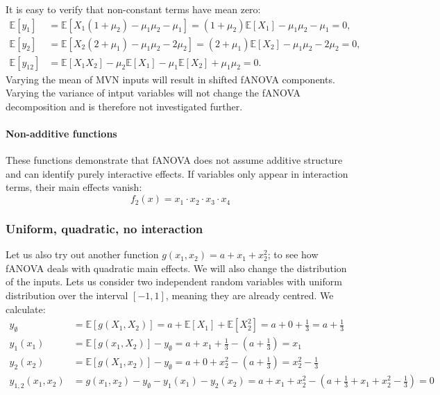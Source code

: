 It is easy to verify that non-constant terms have mean zero:
\begin{align*}
    \mathbb{E}[y_1] &= \mathbb{E}[X_1 (1 + \mu_2) - \mu_1 \mu_2 - \mu_1] = (1 + \mu_2) \mathbb{E}[X_1] - \mu_1 \mu_2 - \mu_1 = 0, \\
    \mathbb{E}[y_2] &= \mathbb{E}[X_2 (2 + \mu_1) - \mu_1 \mu_2 - 2\mu_2] = (2 + \mu_1) \mathbb{E}[X_2] - \mu_1 \mu_2 - 2\mu_2 = 0, \\
    \mathbb{E}[y_{12}] &= \mathbb{E}[X_1X_2] - \mu_2 \mathbb{E}[X_1] - \mu_1 \mathbb{E}[X_2] + \mu_1 \mu_2 = 0.
\end{align*}
Varying the mean of MVN inputs will result in shifted fANOVA components. Varying the variance of intput variables will not change the fANOVA decomposition and is therefore not investigated further.

\paragraph{Non-additive functions}
These functions demonstrate that fANOVA does not assume additive structure and can identify purely interactive effects. If variables only appear in interaction terms, their main effects vanish:
\[
f_2(x) = x_1 \cdot x_2 \cdot x_3 \cdot x_4
\]


\subsubsection*{Uniform, quadratic, no interaction}
Let us also try out another function $g(x_1, x_2) = a + x_1 + x_2^2$; to see how fANOVA deals with quadratic main effects. 
We will also change the distribution of the inputs. Lets us consider two independent random variables with uniform distribution over the interval \([-1, 1]\), meaning they are already centred. We calculate:
\begin{align*}
y_\emptyset &= \mathbb{E}[g(X_1, X_2)] = a + \mathbb{E}[X_1] + \mathbb{E}[X_2^2] = a + 0 + \tfrac{1}{3} = a + \tfrac{1}{3} \\
y_1(x_1) &= \mathbb{E}[g(x_1, X_2)] - y_\emptyset = a + x_1 + \tfrac{1}{3} - \left(a + \tfrac{1}{3}\right) = x_1 \\
y_2(x_2) &= \mathbb{E}[g(X_1, x_2)] - y_\emptyset = a + 0 + x_2^2 - \left(a + \tfrac{1}{3}\right) = x_2^2 - \tfrac{1}{3} \\
y_{1,2}(x_1, x_2) &= g(x_1, x_2) - y_\emptyset - y_1(x_1) - y_2(x_2) = a + x_1 + x_2^2 - \left(a + \tfrac{1}{3} + x_1 + x_2^2 - \tfrac{1}{3}\right) = 0
\end{align*}

